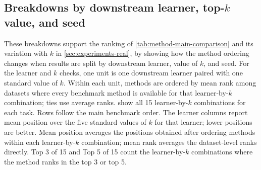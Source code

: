 \subsection{Breakdowns by downstream learner, \texorpdfstring{top-$k$}{top-k} value, and seed}

These breakdowns support the ranking of \cref{tab:method-main-comparison} and
its variation with $k$ in \cref{sec:experiments-real}, by showing how the
method ordering changes when results are split by downstream learner, value of
$k$, and seed. For the learner and $k$ checks, one unit is one downstream learner paired with
one standard value of $k$. Within each unit, methods are ordered by mean rank
among datasets where every benchmark method is available for that learner-by-$k$
combination; ties use average ranks.
show all 15 learner-by-$k$ combinations for each task. Rows follow the main
benchmark order. The
learner columns report mean position over the five standard values of $k$ for
that learner; lower positions are better. Mean position averages the positions
obtained after ordering methods within each learner-by-$k$ combination; mean
rank averages the dataset-level ranks directly. Top 3 of 15 and Top 5 of 15
count the learner-by-$k$ combinations where the method ranks in the top 3 or
top 5.

